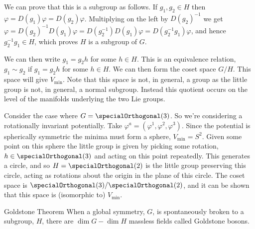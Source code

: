 \documentclass[fleqn]{NotesClass}
\begin{document}
    We can prove that this is a subgroup as follows.
    If \(g_1, g_2 \in H\) then \(\varphi = D(g_1) \varphi = D(g_2) \varphi\).
    Multiplying on the left by \(D(g_2)^{-1}\) we get \(\varphi = D(g_2)^{-1}D(g_1)\varphi = D(g_2^{-1})D(g_1) \varphi = D(g_2^{-1}g_1)\varphi\), and hence \(g_2^{-1}g_1 \in H\), which proves \(H\) is a subgroup of \(G\).
    
    We can then write \(g_1 = g_2 h\) for some \(h \in H\).
    This is an equivalence relation, \(g_1 \sim g_2\) if \(g_1 = g_2 h\) for some \(h \in H\).
    We can then form the coset space \(G/H\).
    This space will give \(V_{\min}\).
    Note that this space is not, in general, a group as the little group is not, in general, a normal subgroup.
    Instead this quotient occurs on the level of the manifolds underlying the two Lie groups.
    
    \begin{exm}{}{}
        Consider the case where \(G = \specialOrthogonal(3)\).
        So we're considering a rotationally invariant potentially.
        Take \(\varphi^a = (\varphi^1, \varphi^2, \varphi^3)\).
        Since the potential is spherically symmetric the minima must form a sphere, \(V_{\min} = S^2\).
        Given some point on this sphere the little group is given by picking some rotation, \(h \in \specialOrthogonal(3)\) and acting on this point repeatedly.
        This generates a circle, and so \(H = \specialOrthogonal(2)\) is the little group preserving this circle, acting as rotations about the origin in the plane of this circle.
        The coset space is \(\specialOrthogonal(3) / \specialOrthogonal(2)\), and it can be shown that this space is (isomorphic to) \(V_{\min}\).
    \end{exm}
    
    \begin{thm}{Goldstone Theorem}{}
        When a global symmetry, \(G\), is spontaneously broken to a subgroup, \(H\), there are \(\dim G - \dim H\) massless fields called Goldstone bosons.
    \end{thm}
    
\end{document}
